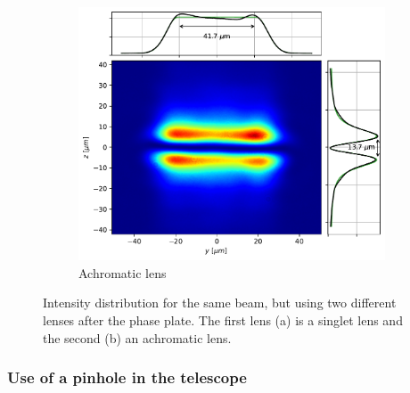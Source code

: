\begin{figure}
\begin{subfigure}{0.45\textwidth}
        \includegraphics[width=\textwidth]{chapters/chapter_3/figures/achr.pdf}
        \caption{Achromatic lens}
        \label{fig:achr}
    \end{subfigure}
    \caption{Intensity distribution for the same beam, but using two different lenses after the phase plate. The first lens (a) is a singlet lens and the second (b) an achromatic lens.}
    \label{fig:sing_achr}
\end{figure}

\subsubsection{Use of a pinhole in the telescope}

